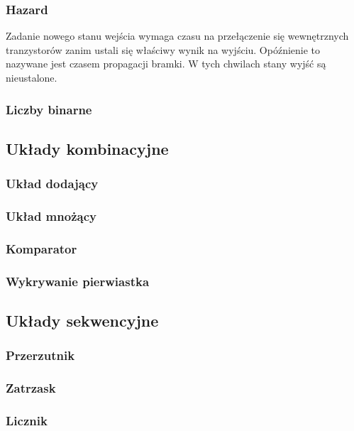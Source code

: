 \documentclass[a4paper,12pt]{article}
\begin{document}
\subsubsection{Hazard}
Zadanie nowego stanu wejścia wymaga czasu na przełączenie się wewnętrznych tranzystorów zanim ustali się właściwy wynik na wyjściu. Opóźnienie to nazywane jest czasem propagacji bramki. W tych chwilach stany wyjść są nieustalone.

\subsubsection{Liczby binarne}

\subsection{Układy kombinacyjne}

\subsubsection{Układ dodający}

\subsubsection{Układ mnożący}

\subsubsection{Komparator}

\subsubsection{Wykrywanie pierwiastka}


\subsection{Układy sekwencyjne}

\subsubsection{Przerzutnik}

\subsubsection{Zatrzask}

\subsubsection{Licznik}
\end{document}
